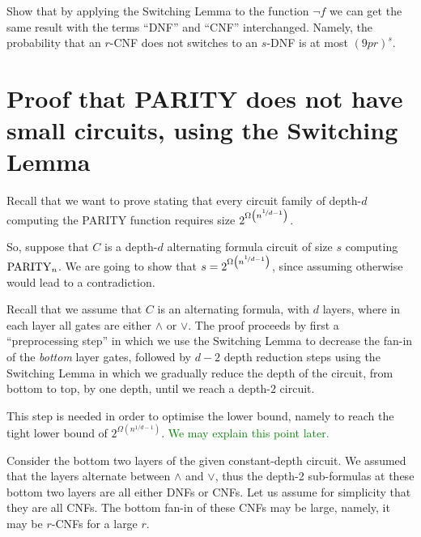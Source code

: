 \begin{exercise} Show that by applying the Switching Lemma to the function $\neg f$ we can get the same result with the terms ``DNF'' and ``CNF'' interchanged. Namely, the probability that an $r$-CNF does not switches to an $s$-DNF is at most $(9pr)^s$.
\end{exercise}

\section{Proof that PARITY does not have small circuits, using the Switching Lemma}

Recall that we want to prove   stating that every circuit family of depth-$d$ computing the PARITY function requires size $2^{\Omega\left(n^{\nicefrac{1}{d-1}}\right)}$.

So, suppose  that $C$ is a depth-$d$ alternating formula circuit of size $s$ computing $\operatorname{PARITY}_n$. We are going to show that $s= 2^{\Omega\left(n^{\nicefrac{1}{d-1}}\right)}$, since assuming otherwise would lead to a contradiction.


Recall that we assume that $C$ is an alternating formula, with $d$ layers, where in each layer all gates are either $\land$ or $\lor$.  The proof proceeds by first a ``preprocessing step'' in which we use the Switching Lemma to decrease the fan-in of the \emph{bottom} layer gates, followed by   $d-2$ depth reduction steps using the Switching Lemma in which we gradually reduce the depth of the circuit, from bottom to top, by one depth, until we reach a depth-$2$ circuit.









This step is needed in order to optimise the lower bound, namely to reach the tight lower bound of $2^{\Omega(n^{1/d-1})}$. \textcolor{green}{We may explain this point later.}

Consider the bottom two layers of the given constant-depth circuit. We assumed that the layers alternate between $\land$ and $\lor$, thus the depth-2 sub-formulas  at these bottom two layers are all either DNFs or CNFs. Let us assume for simplicity that they are all CNFs. The bottom fan-in of these CNFs may be large, namely, it may be $r$-CNFs for a large $r$. 

